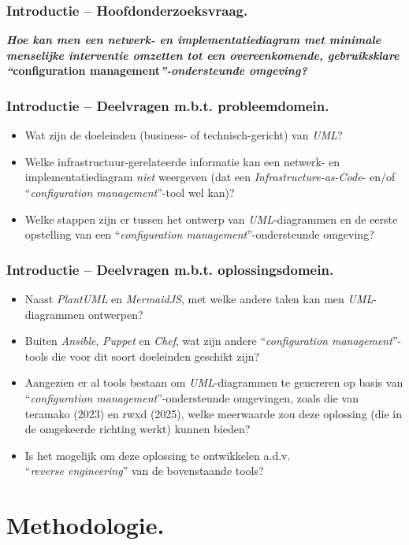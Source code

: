 \documentclass[aspectratio=169]{beamer}
\begin{document}
\begin{frame}
  \frametitle{\huge Introductie -- Hoofdonderzoeksvraag.}
  \textbf{\emph{Hoe kan men een netwerk- en implementatiediagram met minimale menselijke interventie omzetten tot een overeenkomende, gebruiksklare ``}configuration management\emph{''-ondersteunde omgeving?}}
\end{frame}

\begin{frame}
  \frametitle{\Large Introductie -- Deelvragen m.b.t. probleemdomein.}
  \begin{itemize}
    \item Wat zijn de doeleinden (business- of technisch-gericht) van \emph{UML}?
    \item Welke infrastructuur-gerelateerde informatie kan een netwerk- en implementatiediagram \emph{niet} weergeven (dat een \emph{Infrastructure-as-Code}- en/of ``\emph{configuration management}''-tool wel kan)?
    \item Welke stappen zijn er tussen het ontwerp van \emph{UML}-diagrammen en de eerste opstelling van een ``\emph{configuration management}''-ondersteunde omgeving?
  \end{itemize}
\end{frame}

\begin{frame}
  \frametitle{\Large Introductie -- Deelvragen m.b.t. oplossingsdomein.}
  \begin{itemize}
    \item Naast \emph{PlantUML} en \emph{MermaidJS}, met welke andere talen kan men \emph{UML}-diagrammen ontwerpen?
    \item Buiten \emph{Ansible}, \emph{Puppet} en \emph{Chef}, wat zijn andere ``\emph{configuration management}''-tools die voor dit soort doeleinden geschikt zijn?
    \item Aangezien er al tools bestaan om \emph{UML}-diagrammen te genereren op basis van ``\emph{configuration management}''-ondersteunde omgevingen, zoals die van teramako (2023) en rwxd (2025), welke meerwaarde zou deze oplossing (die in de omgekeerde richting werkt) kunnen bieden?
    \item Is het mogelijk om deze oplossing te ontwikkelen a.d.v.\\``\emph{reverse engineering}'' van de bovenstaande tools?
  \end{itemize}
\end{frame}

\section{Methodologie.}
\end{document}
